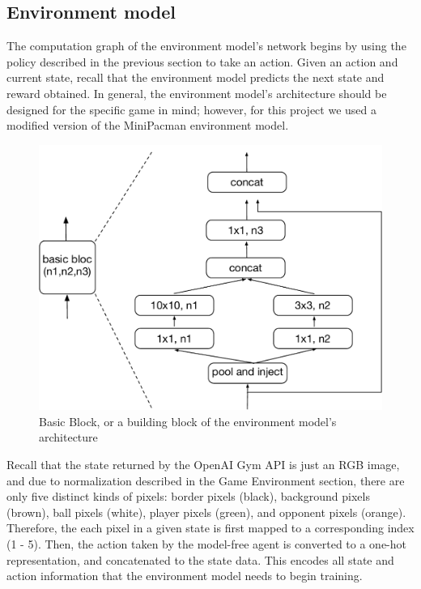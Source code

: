 \documentclass[10pt, twocolumn]{article}
\begin{document}
\subsection{Environment model}

The computation graph of the environment model's network begins by using the policy described in the
previous section to take an action. Given an action and current state, recall that the environment model
predicts the next state and reward obtained. In general, the environment model's architecture should be
designed for the specific game in mind; however, for this project we used a modified version of the
MiniPacman environment model.

\begin{figure}[H]
\centering
\includegraphics[scale=0.3]{basic_layer}
\caption{Basic Block, or a building block of the environment model's architecture}
\end{figure}

Recall that the state returned by the OpenAI Gym API is just an RGB image, and due to normalization 
described in the Game Environment section, there are only five distinct kinds of pixels: border pixels (black),
background pixels (brown), ball pixels (white), player pixels (green), and opponent pixels (orange).
Therefore, the each pixel in a given state is first mapped to a corresponding index (1 - 5). Then, the action
taken by the model-free agent is converted to a one-hot representation, and concatenated to the
state data. This encodes all state and action information that the environment model needs to begin training.
\end{document}
